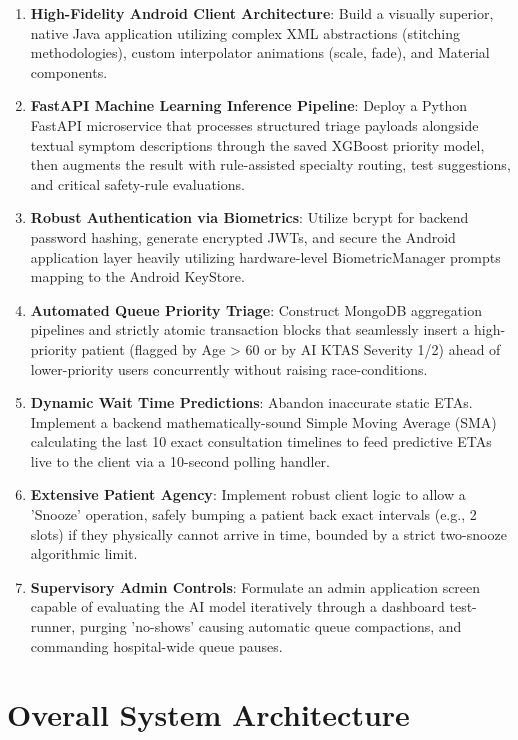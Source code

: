 \documentclass[12pt,a4paper]{article}
\begin{document}
\begin{enumerate}
    \item \textbf{High-Fidelity Android Client Architecture}: Build a visually superior, native Java application utilizing complex XML abstractions (stitching methodologies), custom interpolator animations (scale, fade), and Material components.
    \item \textbf{FastAPI Machine Learning Inference Pipeline}: Deploy a Python FastAPI microservice that processes structured triage payloads alongside textual symptom descriptions through the saved XGBoost priority model, then augments the result with rule-assisted specialty routing, test suggestions, and critical safety-rule evaluations.
    \item \textbf{Robust Authentication via Biometrics}: Utilize bcrypt for backend password hashing, generate encrypted JWTs, and secure the Android application layer heavily utilizing hardware-level BiometricManager prompts mapping to the Android KeyStore.
    \item \textbf{Automated Queue Priority Triage}: Construct MongoDB aggregation pipelines and strictly atomic transaction blocks that seamlessly insert a high-priority patient (flagged by Age > 60 or by AI KTAS Severity 1/2) ahead of lower-priority users concurrently without raising race-conditions.
    \item \textbf{Dynamic Wait Time Predictions}: Abandon inaccurate static ETAs. Implement a backend mathematically-sound Simple Moving Average (SMA) calculating the last 10 exact consultation timelines to feed predictive ETAs live to the client via a 10-second polling handler.
    \item \textbf{Extensive Patient Agency}: Implement robust client logic to allow a 'Snooze' operation, safely bumping a patient back exact intervals (e.g., 2 slots) if they physically cannot arrive in time, bounded by a strict two-snooze algorithmic limit.
    \item \textbf{Supervisory Admin Controls}: Formulate an admin application screen capable of evaluating the AI model iteratively through a dashboard test-runner, purging 'no-shows' causing automatic queue compactions, and commanding hospital-wide queue pauses.
\end{enumerate}

\section{Overall System Architecture}
\end{document}
